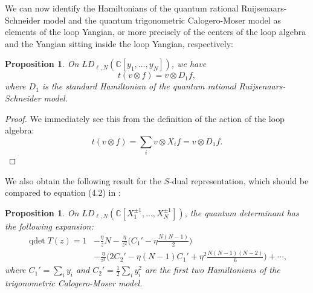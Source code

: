\documentclass[11pt]{report}
\newtheorem{prop}[theorem]{Proposition}
\theoremstyle{definition}
\theoremstyle{remark}
\theoremstyle{remark}
\newcommand{\C}{\mathbb{C}}
\begin{document}
We can now identify the Hamiltonians of the quantum rational Ruijsenaars-Schneider model and the quantum trigonometric Calogero-Moser model as elements of the loop Yangian, or more precisely of the centers of the loop algebra and the Yangian sitting inside the loop Yangian, respectively:

\begin{prop}
On $LD_{\ell,N}(\C[y_1,...,y_N])$, we have
\begin{equation*}
t(v \otimes f) = v \otimes D_1 f,
\end{equation*}
where $D_1$ is the standard Hamiltonian of the quantum rational Ruijsenaars-Schneider model.
\end{prop}

\begin{proof}
We immediately see this from the definition of the action of the loop algebra:
\begin{equation*}
t(v \otimes f) = \sum_i v \otimes X_i f = v \otimes D_1 f.
\end{equation*}
\end{proof}

We also obtain the following result for the $S$-dual representation, which should be compared to equation (4.2) in \cite{article:bernard:1993}:

\begin{prop}
On $LD_{\ell,N}(\C[X_1^{\pm 1},...,X_N^{\pm 1}])$, the quantum determinant has the following expansion:
\begin{align*}
\operatorname{qdet} T(z)
= 1 &- \frac{\eta}{z} N - \frac{\eta}{z^2} \bigg( C_1' - \eta \frac{N(N-1)}{2} \bigg) \\
&- \frac{\eta}{z^3} \bigg( 2C_2' - \eta (N-1) C_1' + \eta^2 \frac{N(N-1)(N-2)}{6} \bigg) + \cdots,
\end{align*}
where $C_1' = \sum_i y_i$ and $C_2' = \frac{1}{2}\sum_i y_i^2$ are the first two Hamiltonians of the trigonometric Calogero-Moser model.
\end{prop}
\end{document}
